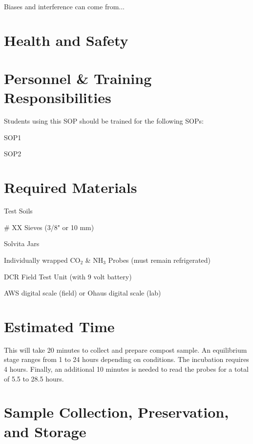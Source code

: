 \documentclass[12pt]{../SOP4_alpha}\usepackage[]{graphicx}\usepackage[]{xcolor}
\begin{document}
\NP Biases and interference can come from...



\section{Health and Safety}



\section{Personnel \& Training Responsibilities}


Students using this SOP should be trained for the following SOPs:

\begin{itemize*}
  \item SOP1
  \item SOP2
\end{itemize*}

\section{Required Materials}

\begin{itemize*}
  \item Test Soils
  \item \# XX Sieves (3/8" or 10 mm)
  \item Solvita Jars
  \item Individually wrapped CO$_2$ \& NH$_3$ Probes (must remain refrigerated) 
  \item DCR Field Test Unit (with 9 volt battery)
  \item AWS digital scale (field) or Ohaus digital scale (lab)
\end{itemize*}

\section{Estimated Time}

\NP This will take 20 minutes to collect and prepare compost sample. An equilibrium stage ranges from 1 to 24 hours depending on conditions. The incubation requires 4 hours. Finally, an additional 10 minutes is needed to read the probes for a total of 5.5 to 28.5 hours.

\section{Sample Collection, Preservation, and Storage}
\end{document}
